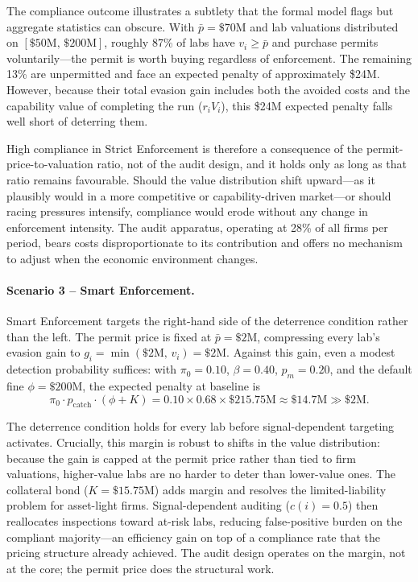 The compliance outcome illustrates a subtlety that the formal model flags but
aggregate statistics can obscure. With $\bar{p} = \$70$M and lab valuations
distributed on $[\$50\text{M},\,\$200\text{M}]$, roughly 87\% of labs have
$v_i \geq \bar{p}$ and purchase permits voluntarily---the permit is worth
buying regardless of enforcement. The remaining 13\% are unpermitted and face
an expected penalty of approximately \$24M. However, because their total evasion gain
includes both the avoided costs and the capability value of completing the run ($r_i V_i$),
this \$24M expected penalty falls well short of deterring them. 

High compliance in Strict
Enforcement is therefore a consequence of the permit-price-to-valuation ratio, not of
the audit design, and it holds only as long as that ratio remains favourable. Should the
value distribution shift upward---as it plausibly would in a more competitive or
capability-driven market---or should racing pressures intensify, compliance would erode
without any change in enforcement intensity. The audit apparatus, operating at 28\% of
all firms per period, bears costs disproportionate to its contribution and offers no
mechanism to adjust when the economic environment changes.

\paragraph{Scenario 3 -- Smart Enforcement.}

Smart Enforcement targets the right-hand side of the deterrence condition rather than the left. The permit price is fixed at $\bar{p} = \$2$M, compressing every lab's evasion gain to $g_i = \min(\$2\text{M},\,v_i) = \$2\text{M}$. Against this gain, even a modest detection probability suffices: with $\pi_0 = 0.10$, $\beta = 0.40$, $p_m = 0.20$, and the default fine $\phi = \$200$M, the expected penalty at baseline is
%
\[
  \pi_0 \cdot p_{\mathrm{catch}} \cdot (\phi + K)
  = 0.10 \times 0.68 \times \$215.75\text{M}
  \approx \$14.7\text{M} \gg \$2\text{M}.
\]
%

The deterrence condition holds for every lab before signal-dependent targeting activates. Crucially, this margin is robust to shifts in the value distribution: because the gain is capped at the permit price rather than tied to firm valuations, higher-value labs are no harder to deter than lower-value ones. The collateral bond ($K = \$15.75$M) adds margin and resolves the limited-liability problem for asset-light firms. Signal-dependent auditing ($c(i) = 0.5$) then reallocates inspections toward at-risk labs, reducing false-positive burden on the compliant majority---an efficiency gain on top of a compliance rate that the pricing structure already achieved. The audit design operates on the margin, not at the core; the permit price does the structural work.

